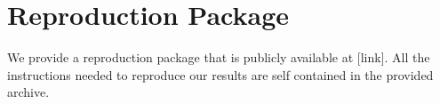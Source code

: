 \documentclass[10pt,journal,compsoc, twoside]{IEEEtran}
\begin{document}
\section{Reproduction Package}

We provide a reproduction package that is publicly available at [link].
All the instructions needed to reproduce our results are self contained in the provided archive.


% 


\ifCLASSOPTIONcaptionsoff
  \newpage
\fi



\end{document}
